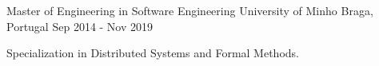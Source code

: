 

\begin{cventries}

  \cventry
    {Master of Engineering in Software Engineering} %
    {University of Minho} %
    {Braga, Portugal} %
    {Sep 2014 - Nov 2019} %
    {
      \begin{cvitems} %
        \item {Specialization in Distributed Systems and Formal Methods.}
      \end{cvitems} 
    }
\end{cventries}
